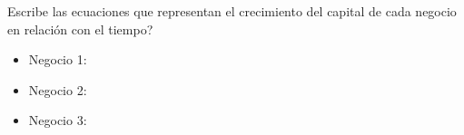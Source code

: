 Escribe las ecuaciones que representan el crecimiento del capital de cada negocio en relación con el tiempo?

\begin{itemize}
    \item Negocio 1: \fillin[$y = 100x + 1 000$][3cm]
    \item Negocio 2: \fillin[$y = 100x + 600$][3cm]
    \item Negocio 3: \fillin[$y = 133.33x$][3cm]
\end{itemize}
